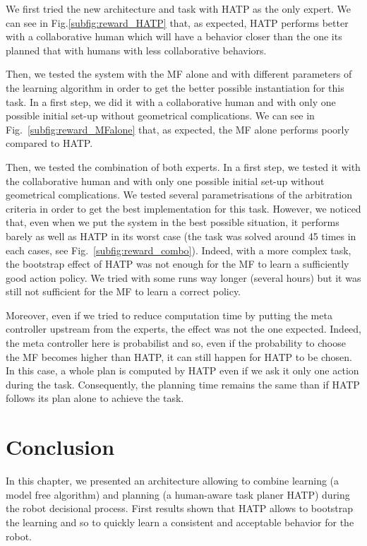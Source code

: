 \documentclass[english,a4paper,11pt,twoside]{StyleThese}
\begin{document}
We first tried the new architecture and task with HATP as the only expert. We can see in Fig.\ref{subfig:reward_HATP} that, as expected, HATP performs better with a collaborative human which will have a behavior closer than the one its planned that with humans with less collaborative behaviors. 

Then, we tested the system with the MF alone and with different parameters of the learning algorithm in order to get the better possible instantiation for this task. In a first step, we did it with a collaborative human and with only one possible initial set-up without geometrical complications. We can see in Fig.~\ref{subfig:reward_MFalone} that, as expected, the MF alone performs poorly compared to HATP.

Then, we tested the combination of both experts. In a first step, we tested it with the collaborative human and with only one possible initial set-up without geometrical complications. We tested several parametrisations of the arbitration criteria in order to get the best implementation for this task. However, we noticed that, even when we put the system in the best possible situation, it performs barely as well as HATP in its worst case (the task was solved around 45 times in each cases, see Fig.~\ref{subfig:reward_combo}). Indeed, with a more complex task, the bootstrap effect of HATP was not enough for the MF to learn a sufficiently good action policy. We tried with some runs way longer (several hours) but it was still not sufficient for the MF to learn a correct policy. 

Moreover, even if we tried to reduce computation time by putting the meta controller upstream from the experts, the effect was not the one expected. Indeed, the meta controller here is probabilist and so, even if the probability to choose the MF becomes higher than HATP, it can still happen for HATP to be chosen. In this case, a whole plan is computed by HATP even if we ask it only one action during the task. Consequently, the planning time remains the same than if HATP follows its plan alone to achieve the task.

\section{Conclusion}

In this chapter, we presented an architecture allowing to combine learning (a model free algorithm) and planning (a human-aware task planer HATP) during the robot decisional process. First results shown that HATP allows to bootstrap the learning and so to quickly learn a consistent and acceptable behavior for the robot.
\end{document}
